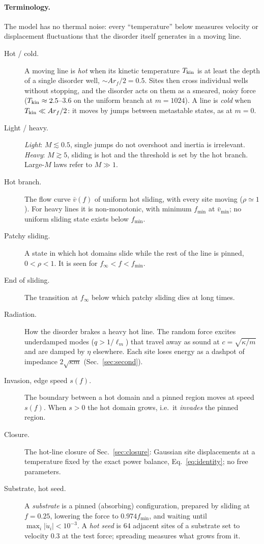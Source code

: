 \documentclass[10pt,a4paper]{article}
\begin{document}
\paragraph{Terminology.} The model has no thermal noise: every ``temperature'' below measures velocity or displacement fluctuations that the disorder itself generates in a moving line.
\begin{description}
\item[Hot / cold.] A moving line is \emph{hot} when its kinetic temperature $T_{\rm kin}$ is at least the depth of a single disorder well, $\sim Ar_f/2=0.5$. Sites then cross individual wells without stopping, and the disorder acts on them as a smeared, noisy force ($T_{\rm kin}\approx2.5$--$3.6$ on the uniform branch at $m=1024$). A line is \emph{cold} when $T_{\rm kin}\ll Ar_f/2$: it moves by jumps between metastable states, as at $m=0$.
\item[Light / heavy.] \emph{Light}: $M\lesssim0.5$, single jumps do not overshoot and inertia is irrelevant. \emph{Heavy}: $M\gtrsim5$, sliding is hot and the threshold is set by the hot branch. Large-$M$ laws refer to $M\gg1$.
\item[Hot branch.] The flow curve $\bar v(f)$ of uniform hot sliding, with every site moving ($\rho\simeq1$). For heavy lines it is non-monotonic, with minimum $f_{\min}$ at $\bar v_{\min}$; no uniform sliding state exists below $f_{\min}$.
\item[Patchy sliding.] A state in which hot domains slide while the rest of the line is pinned, $0<\rho<1$. It is seen for $f_\infty<f<f_{\min}$.
\item[End of sliding.] The transition at $f_\infty$ below which patchy sliding dies at long times.
\item[Radiation.] How the disorder brakes a heavy hot line. The random force excites underdamped modes ($q>1/\ell_m$) that travel away as sound at $c=\sqrt{\kappa/m}$ and are damped by $\eta$ elsewhere. Each site loses energy as a dashpot of impedance $2\sqrt{\kappa m}$ (Sec.~\ref{sec:second}).
\item[Invasion, edge speed $s(f)$.] The boundary between a hot domain and a pinned region moves at speed $s(f)$. When $s>0$ the hot domain grows, i.e.\ it \emph{invades} the pinned region.
\item[Closure.] The hot-line closure of Sec.~\ref{sec:closure}: Gaussian site displacements at a temperature fixed by the exact power balance, Eq.~\eqref{eq:identity}; no free parameters.
\item[Substrate, hot seed.] A \emph{substrate} is a pinned (absorbing) configuration, prepared by sliding at $f=0.25$, lowering the force to $0.974f_{\min}$, and waiting until $\max_i|\dot u_i|<10^{-3}$. A \emph{hot seed} is 64 adjacent sites of a substrate set to velocity $0.3$ at the test force; spreading measures what grows from it.

\end{description}
\end{document}
